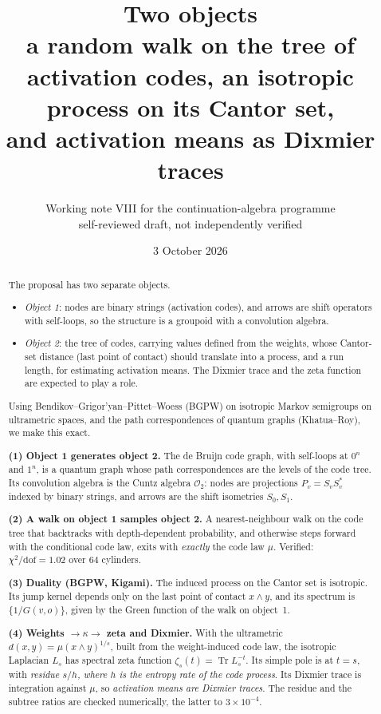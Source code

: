 \documentclass[11pt]{article}
\title{Two objects\\[4pt]
\large a random walk on the tree of activation codes, an isotropic process on its Cantor set,\\
and activation means as Dixmier traces}
\author{Working note VIII for the continuation-algebra programme\\
\small self-reviewed draft, not independently verified}
\date{3 October 2026}
\theoremstyle{definition}
\theoremstyle{remark}
\newcommand{\Tr}{\operatorname{Tr}}
\begin{document}
\maketitle

\begin{abstract}
The proposal has two separate objects.
\begin{itemize}
\item \emph{Object 1}: nodes are binary strings (activation codes), and arrows are shift operators with self-loops, so the structure is a groupoid with a convolution algebra.
\item \emph{Object 2}: the tree of codes, carrying values defined from the weights, whose Cantor-set distance (last point of contact) should translate into a process, and a run length, for estimating activation means. The Dixmier trace and the zeta function are expected to play a role.
\end{itemize}
Using Bendikov--Grigor'yan--Pittet--Woess (BGPW) on isotropic Markov semigroups on ultrametric spaces, and the path correspondences of quantum graphs (Khatua--Roy), we make this exact.

\textbf{(1) Object 1 generates object 2.} The de Bruijn code graph, with self-loops at $0^n$ and $1^n$, is a quantum graph whose path correspondences are the levels of the code tree. Its convolution algebra is the Cuntz algebra $\mathcal O_2$: nodes are projections $P_v=S_vS_v^*$ indexed by binary strings, and arrows are the shift isometries $S_0,S_1$.

\textbf{(2) A walk on object 1 samples object 2.} A nearest-neighbour walk on the code tree that backtracks with depth-dependent probability, and otherwise steps forward with the conditional code law, exits with \emph{exactly} the code law $\mu$. Verified: $\chi^2/\mathrm{dof}=1.02$ over $64$ cylinders.

\textbf{(3) Duality (BGPW, Kigami).} The induced process on the Cantor set is isotropic. Its jump kernel depends only on the last point of contact $x\wedge y$, and its spectrum is $\{1/G(v,o)\}$, given by the Green function of the walk on object~1.

\textbf{(4) Weights $\to\kappa\to$ zeta and Dixmier.} With the ultrametric $d(x,y)=\mu(x\wedge y)^{1/s}$, built from the weight-induced code law, the isotropic Laplacian $L_s$ has spectral zeta function $\zeta_s(t)=\Tr L_s^{-t}$. Its simple pole is at $t=s$, with \emph{residue $s/h$, where $h$ is the entropy rate of the code process}. Its Dixmier trace is integration against $\mu$, so \emph{activation means are Dixmier traces}. The residue and the subtree ratios are checked numerically, the latter to $3\times10^{-4}$.


\end{abstract}
\end{document}
